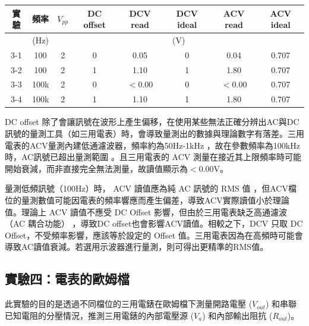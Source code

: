 \documentclass[12pt,a4paper]{article}
\begin{document}
\begin{CJK}{UTF8}{bkai}
\begin{center}
    \begin{tabular}{c|c|c|c|c|c|c|c}
    實驗  &   頻率  &   $V_{pp}$    &   DC offset   &   DCV read    &   DCV ideal   &   ACV read    &   ACV ideal  \\\hline
        &   (Hz)    & \multicolumn{6}{c}{(V)}\\
    \hline
    \hline
    3-1 &   100   &   2  &   0  &   0.05    &   0   &   0.04    &   0.707\\\hline
    3-2 &   100 &   2   &   1   &   1.10    &   1   &   1.80    &   0.707\\\hline
    3-3 &   100k &   2   &   0   &   $<$0.00    &   0   &   $<$0.00    &   0.707\\\hline
    3-4 &   100k &   2   &   1   &   1.10    &   1   &   1.80    &   0.707\\\hline
    \end{tabular}
\end{center}

DC offset 除了會讓訊號在波形上產生偏移，在使用某些無法正確分辨出AC與DC訊號的量測工具（如三用電表）時，會導致量測出的數據與理論數字有落差。三用電表的ACV量測內建低通濾波器，頻率約為50Hz-1kHz ，故在參數頻率為100kHz時，AC訊號已超出量測範圍 。且三用電表的 ACV 測量在接近其上限頻率時可能開始衰減，而非直接完全無法測量，故讀值顯示為$<$0.00V。

量測低頻訊號（100Hz）時， ACV 讀值應為純 AC 訊號的 RMS 值 ，但ACV檔位的量測數值可能因電表的頻率響應而產生偏差，導致ACV實際讀值小於理論值。理論上 ACV 讀值不應受 DC Offset 影響，但由於三用電表缺乏高通濾波（AC 耦合功能） ，導致DC offset也會影響ACV讀值。相較之下，DCV 只取 DC Offset，不受頻率影響，應該等於設定的 Offset 值。三用電表因為在高頻時可能會導致AC讀值衰減。若選用示波器進行量測，則可得出更精準的RMS值。

\subsection{實驗四：電表的歐姆檔}\label{subsec:result_4}

此實驗的目的是透過不同檔位的三用電錶在歐姆檔下測量開路電壓 ($V_{out}$) 和串聯已知電阻的分壓情況，推測三用電錶的內部電壓源 ($V_{a}$) 和內部輸出阻抗 ($R_{out}$)。


\end{CJK}
\end{document}
